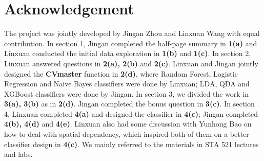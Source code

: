 \documentclass[11pt]{article}
\theoremstyle{definition}
\begin{document}
\section{Acknowledgement}
The project was jointly developed by Jingan Zhou and Linxuan Wang with equal contribution. In section 1, Jingan completed the half-page summary in \textbf{1(a)} and Linxuan conducted the initial data exploration in \textbf{1(b)} and \textbf{1(c)}. In section 2, Linxuan answered questions in \textbf{2(a), 2(b)} and \textbf{2(c)}. Linxuan and Jingan jointly designed the \textbf{CVmaster} function in \textbf{2(d)}, where Random Forest, Logistic Regression and Naive Bayes classifiers were done by Linxuan; LDA, QDA and XGBoost classifiers were done by Jingan. In section 3, we divided the work in \textbf{3(a), 3(b)} as in \textbf{2(d)}. Jingan completed the bonus question in \textbf{3(c)}. In section 4, Linxuan completed \textbf{4(a)} and designed the classifier in \textbf{4(c)}; Jingan completed \textbf{4(b), 4(d)} and \textbf{4(e)}. Linxuan also had some discussion with Yunhong Bao on how to deal with spatial dependency, which inspired both of them on a better classifier design in \textbf{4(c)}. We mainly referred to the materials in STA 521 lectures and labs.
\end{document}
